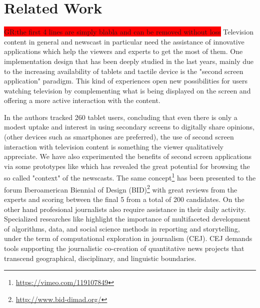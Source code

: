 \documentclass{llncs}
\newcommand{\todo}[1]{\colorbox{red}{#1}}
\begin{document}
\section{Related Work}
\label{sec:RelatedWork}

\todo{GR:the first 4 lines are simply blabla and can be removed without loss}
Television content in general and newscast in particular need the assistance of innovative applications which help the viewers and experts to get the most of them. One implementation design that has been deeply studied in the last years, mainly due to the increasing availability of tablets and tactile device is the "second screen application" paradigm. This kind of experiences open new possibilities for users watching television by complementing what is being displayed on the screen and offering a more active interaction with the content. 

In\cite{Courtois2012} the authors tracked 260 tablet users, concluding that even there is only a modest uptake and interest in using secondary screens to digitally share opinions, (other devices such as smartphones are preferred), the use of second screen interaction with television content is something the viewer qualitatively appreciate. We have also experimented the benefits of second screen applications via some prototypes like\cite{Redondo2014} which has revealed the great potential for browsing the so called "context" of the newscasts. The same concept\footnote{\fontsize{8pt}{1em}\selectfont \url{https://vimeo.com/119107849}} has been presented to the forum Iberoamerican Biennial of Design (BID)\footnote{\fontsize{8pt}{1em}\selectfont \url{http://www.bid-dimad.org/}} with great reviews from the experts and scoring between the final 5 from a total of 200 candidates. On the other hand profesional journalists also require assistance in their daily activity. Specialized researches like\cite{gynnild2014} highlight the importance of multifaceted development of algorithms, data, and social science methods in reporting and storytelling, under the term of computational exploration in journalism (CEJ). CEJ demands tools supporting the journalistic co-creation of quantitative news projects that transcend geographical, disciplinary, and linguistic boundaries.
\end{document}
